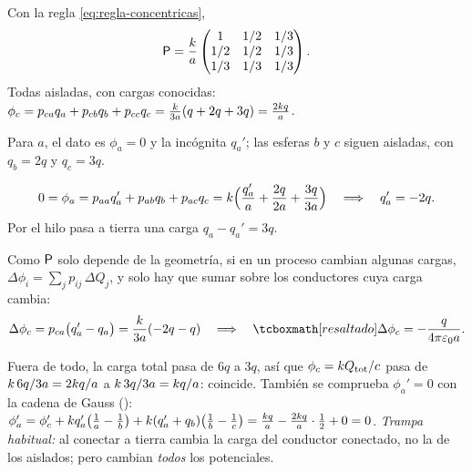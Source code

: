 \begin{resolucion}
 Con la regla \eqref{eq:regla-concentricas},
\[
  \mathsf{P}=\frac{k}{a}\begin{pmatrix}1 & 1/2 & 1/3\\ 1/2 & 1/2 & 1/3\\ 1/3 & 1/3 & 1/3\end{pmatrix}.
\]
 Todas aisladas, con cargas conocidas:
$\phi_c=p_{ca}q_a+p_{cb}q_b+p_{cc}q_c=\frac{k}{3a}(q+2q+3q)=\frac{2k q}{a}$.

 Para $a$, el dato es $\phi_a=0$ y la incógnita $q_a'$; las esferas $b$ y $c$ siguen aisladas, con $q_b=2q$ y
$q_c=3q$.

\[
  0=\phi_a=p_{aa}q_a'+p_{ab}q_b+p_{ac}q_c=k\Bigl(\frac{q_a'}{a}+\frac{2q}{2a}+\frac{3q}{3a}\Bigr)\quad\Longrightarrow\quad q_a'=-2q .
\]
Por el hilo pasa a tierra una carga $q_a-q_a'=3q$.

 Como $\mathsf{P}$ solo depende de la geometría, si en un proceso cambian algunas cargas,
$\Delta\phi_i=\sum_jp_{ij}\,\Delta Q_j$, y solo hay que sumar sobre los conductores cuya carga cambia:
\[
  \Delta\phi_c=p_{ca}\bigl(q_a'-q_a\bigr)=\frac{\kc}{3a}(-2q-q)\quad\Longrightarrow\quad\resalta{\Delta\phi_c=-\frac{q}{4\pi\eo a}.}
\]
\end{resolucion}

\begin{observacion}\label{obs:sem-modelo}
Fuera de todo, la carga total pasa de $6q$ a $3q$, así que $\phi_c=k Q_{\mathrm{tot}}/c$ pasa de $k\,6q/3a=2k q/a$ a $k\,3q/3a=k q/a$: coincide. También se
comprueba $\phi_a'=0$ con la cadena de Gauss ():
$\phi_a'=\phi_c'+k q_a'\bigl(\frac1a-\frac1b\bigr)+k(q_a'+q_b)\bigl(\frac1b-\frac1c\bigr)=\frac{k q}{a}-\frac{2k q}{a}\cdot\frac12+0=0$.
\emph{Trampa habitual:} al conectar a tierra cambia la carga del conductor conectado, no la de los aislados; pero cambian \emph{todos} los potenciales.
\end{observacion}



